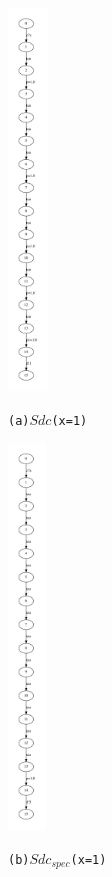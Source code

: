 \documentclass[a4paper,UKenglish,cleveref, autoref]{lipics-v2019}
\begin{document}
\begin{figure} [htbp]
\begin{minipage}{0.1\linewidth}
  \centerline{\includegraphics[width=1.05cm]{images/Sdc-1.pdf}}
  \centerline{\texttt{(a)$Sdc$(x=1)}}
\end{minipage}
\hfill
\hspace{0.5em}
\begin{minipage}{0.1\linewidth}
  \centerline{\includegraphics[width=1.0cm]{images/Sdc-spec-1.pdf}}
  \centerline{\texttt{(b)$Sdc_{spec}$(x=1)}}
\end{minipage}
\hfill
\begin{minipage}{0.1\linewidth}

\end{minipage}
\end{figure}
\end{document}
